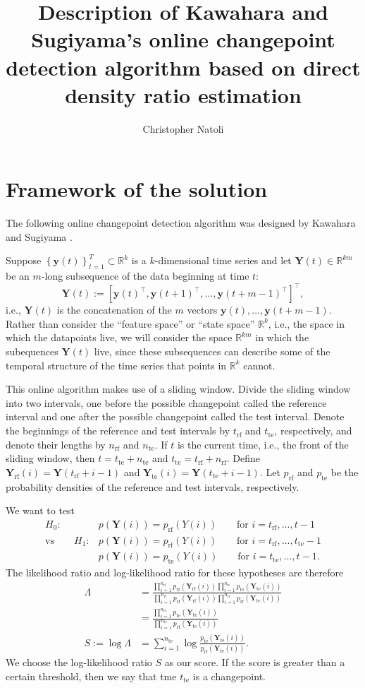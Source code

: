 \documentclass[12pt]{article}
\title{\normalsize\sc Description of Kawahara and Sugiyama's online changepoint detection algorithm based on direct density ratio estimation}
\author{\normalsize Christopher Natoli}
\date{}
\newcommand\bkt[1]{\left[ #1 \right]}
\newcommand\set[1]{\left\{ #1 \right\}}
\newcommand\RR{\mathbb{R}}
\newcommand\yy{\boldsymbol{y}}
\newcommand\YY{{\boldsymbol{Y}}}
\newcommand\rf{{\mathrm{rf}}}
\newcommand\te{{\mathrm{te}}}
\begin{document}
\maketitle

\section{Framework of the solution}

The following online changepoint detection algorithm was designed by Kawahara and Sugiyama \cite{kawahara2012sequential}.

Suppose $\set{\yy(t)}_{t=1}^T\subset\RR^k$ is a $k$-dimensional time series and let $\YY(t)\in\RR^{km}$ be an $m$-long subsequence of the data beginning at time $t$:
$$\YY(t):=\bkt{\yy(t)^\top, \yy(t+1)^\top, \ldots, \yy(t+m-1)^\top}^\top,$$
i.e., $\YY(t)$ is the concatenation of the $m$ vectors $\yy(t),\ldots,\yy(t+m-1)$. Rather than consider the ``feature space'' or ``state space'' $\RR^k$, i.e., the space in which the datapoints live, we will consider the space $\RR^{km}$ in which the subequences $\YY(t)$ live, since these subsequences can describe some of the temporal structure of the time series that points in $\RR^k$ cannot.

This online algorithm makes use of a sliding window. Divide the sliding window into two intervals, one before the possible changepoint called the reference interval and one after the possible changepoint called the test interval. Denote the beginnings of the reference and test intervals by $t_\rf$ and $t_\te$, respectively, and denote their lengths by $n_\rf$ and $n_\te$. If $t$ is the current time, i.e., the front of the sliding window, then $t=t_\te+n_\te$ and $t_\te=t_\rf+n_\rf$. Define $\YY_\rf(i)=\YY(t_\rf+i-1)$ and $\YY_\te(i)=\YY(t_\te+i-1)$. Let $p_\rf$ and $p_\te$ be the probability densities of the reference and test intervals, respectively.

We want to test
\begin{align*}
  H_0\colon&p(\YY(i))=p_\rf(Y(i))\quad\quad\text{for $i=t_\rf,\ldots,t-1$}\\
  \text{vs}\quad\quad
  H_1\colon&p(\YY(i))=p_\rf(Y(i))\quad\quad\text{for $i=t_\rf,\ldots,t_\te-1$}\\
  &p(\YY(i))=p_\te(Y(i))\quad\quad\text{for $i=t_\te,\ldots,t-1$}.
\end{align*}
The likelihood ratio and log-likelihood ratio for these hypotheses are therefore
\begin{align*}
  \Lambda
  &=\frac{\prod_{i=1}^{n_\rf}p_\rf(\YY_\rf(i))\prod_{i=1}^{n_\te}p_\te(\YY_\te(i))}{\prod_{i=1}^{n_\rf}p_\rf(\YY_\rf(i))\prod_{i=1}^{n_\te}p_\rf(\YY_\te(i))}\\
  &=\frac{\prod_{i=1}^{n_\te}p_\te(\YY_\te(i))}{\prod_{i=1}^{n_\te}p_\rf(\YY_\te(i))}\\
  S:=\log\Lambda&=\sum_{i=1}^{n_\te}\log\frac{p_\te(\YY_\te(i))}{p_\rf(\YY_\te(i))}.
\end{align*}
We choose the log-likelihood ratio $S$ as our score. If the score is greater than a certain threshold, %
then we say that tme $t_\te$ is a changepoint.
\end{document}
